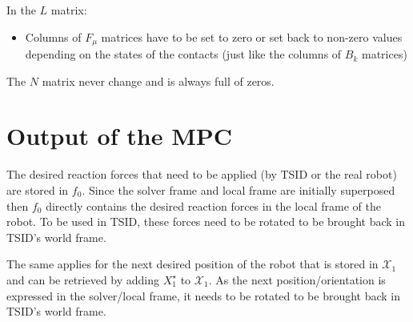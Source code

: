 \documentclass[a4paper,11pt]{article}
\begin{document}
In the $L$ matrix:
\begin{itemize}
	\item Columns of $F_\mu$ matrices have to be set to zero or set back to non-zero values depending on the states of the contacts (just like the columns of $B_k$ matrices)
\end{itemize}

The $N$ matrix never change and is always full of zeros.

\section*{Output of the MPC}

The desired reaction forces that need to be applied (by TSID or the real robot) are stored in $f_0$. Since the solver frame and local frame are initially superposed then $f_0$ directly contains the desired reaction forces in the local frame of the robot. To be used in TSID, these forces need to be rotated to be brought back in TSID's world frame. 

The same applies for the next desired position of the robot that is stored in $\mathcal{X}_1$ and can be retrieved by adding $X_1^\star$ to $\mathcal{X}_1$. As the next position/orientation is expressed in the solver/local frame, it needs to be rotated to be brought back in TSID's world frame.
\end{document}

